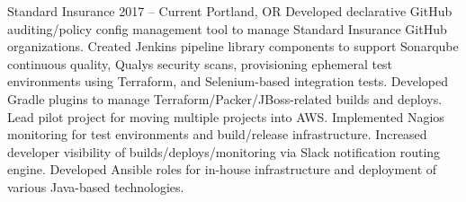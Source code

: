 {Standard Insurance}
{2017 -- Current}
{Portland, OR}
{Developed declarative GitHub auditing/policy config management tool to manage Standard Insurance GitHub organizations. Created Jenkins pipeline library components to support Sonarqube continuous quality, Qualys security scans, provisioning ephemeral test environments using Terraform, and Selenium-based integration tests. Developed Gradle plugins to manage Terraform/Packer/JBoss-related builds and deploys. Lead pilot project for moving multiple projects into AWS. Implemented Nagios monitoring for test environments and build/release infrastructure. Increased developer visibility of builds/deploys/monitoring via Slack notification routing engine. Developed Ansible roles for in-house infrastructure and deployment of various Java-based technologies.}

